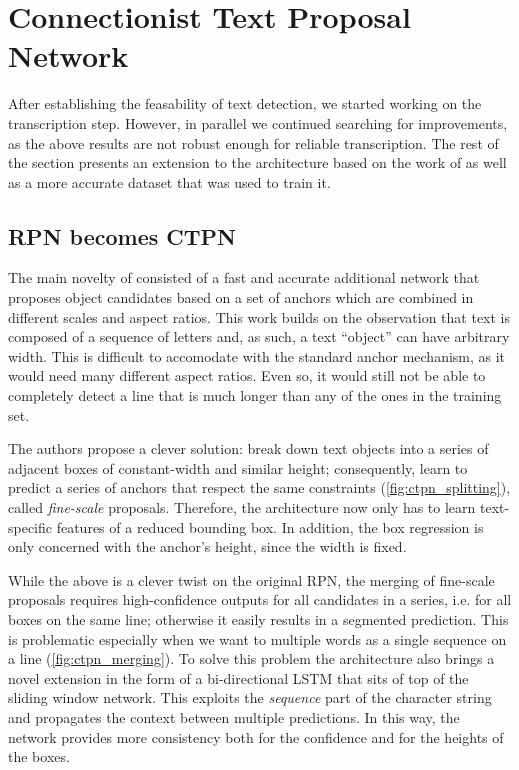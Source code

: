 

\section{Connectionist Text Proposal Network}\label{sec:ctpn}

	After establishing the feasability of text detection, we started working on the transcription step. However, in parallel we continued searching for improvements, as the above results are not robust enough for reliable transcription. The rest of the section presents an extension to the \FRCNN{} architecture based on the work of \citet{CRNN} as well as a more accurate dataset that was used to train it.


	\subsection{RPN becomes CTPN}
		The main novelty of \FRCNN{} consisted of a fast and accurate additional network that proposes object candidates based on a set of anchors which are combined in different scales and aspect ratios. This work builds on the observation that text is composed of a sequence of letters and, as such, a text ``object'' can have arbitrary width. This is difficult to accomodate with the standard anchor mechanism, as it would need many different aspect ratios. Even so, it would still not be able to completely detect a line that is much longer than any of the ones in the training set.

		The authors propose a clever solution: break down text objects into a series of adjacent boxes of constant-width and similar height; consequently, learn to predict a series of anchors that respect the same constraints (\autoref{fig:ctpn_splitting}), called \emph{fine-scale} proposals. Therefore, the architecture now only has to learn text-specific features of a reduced bounding box. In addition, the box regression is only concerned with the anchor's height, since the width is fixed.

		While the above is a clever twist on the original RPN, the merging of fine-scale proposals requires high-confidence outputs for all candidates in a series, i.e. for all boxes on the same line; otherwise it easily results in a segmented prediction. This is problematic especially when we want to multiple words as a single sequence on a line (\autoref{fig:ctpn_merging}). To solve this problem the \CTPN{} architecture also brings a novel extension in the form of a bi-directional LSTM that sits of top of the sliding window network. This exploits the \emph{sequence} part of the character string and propagates the context between multiple predictions. In this way, the network provides more consistency both for the confidence and for the heights of the boxes.

